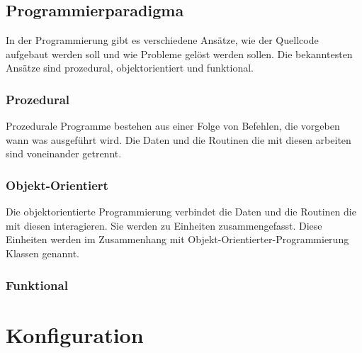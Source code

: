     \subsection{Programmierparadigma\label{sub:TechnologyParadigma}}

      In der Programmierung gibt es verschiedene Ansätze,
      wie der Quellcode aufgebaut werden soll und wie Probleme gelöst werden sollen.
      Die bekanntesten Ansätze sind prozedural, objektorientiert und funktional.

      \subsubsection{Prozedural\label{subsub:TechnologyParadigmaProzedural}}

        Prozedurale Programme bestehen aus einer Folge von Befehlen,
        die vorgeben wann was ausgeführt wird.
        Die Daten und die Routinen die mit diesen arbeiten sind voneinander getrennt.

      \subsubsection{Objekt-Orientiert\label{subsub:TechnologyParadigmaObjectOriented}}

        Die objektorientierte Programmierung verbindet die Daten und
        die Routinen die mit diesen interagieren. Sie werden zu Einheiten zusammengefasst.
        Diese Einheiten werden im Zusammenhang mit Objekt-Orientierter-Programmierung Klassen genannt.

      \subsubsection{Funktional\label{subsub:TechnologyParadigmaFunctional}}


  \section{Konfiguration\label{sec:Konfiguration}}

